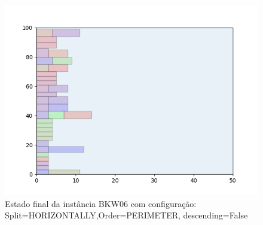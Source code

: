 \begin{figure}[H]
    \centering
    \caption[]{Estado final da instância BKW06 com configuração: Split=HORIZONTALLY,Order=PERIMETER, descending=False}
    \label{fig:bkw06-horizontally-perimeter-false}
    \includegraphics[scale=0.5]{output/figures/bkw/bkw06/horizontally/perimeter/false/00}
\end{figure}